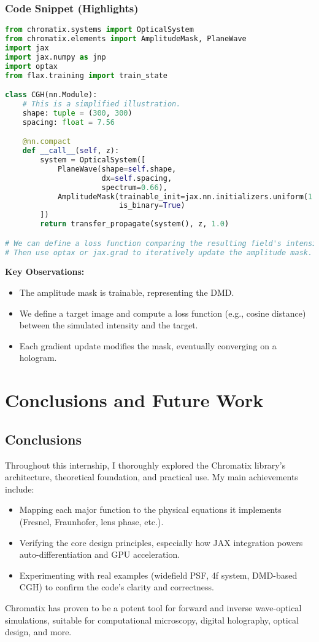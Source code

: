\documentclass[a4paper,12pt]{report}
\begin{document}
\subsection{Code Snippet (Highlights)}
\begin{lstlisting}[language=Python]
from chromatix.systems import OpticalSystem
from chromatix.elements import AmplitudeMask, PlaneWave
import jax
import jax.numpy as jnp
import optax
from flax.training import train_state

class CGH(nn.Module):
    # This is a simplified illustration.
    shape: tuple = (300, 300)
    spacing: float = 7.56

    @nn.compact
    def __call__(self, z):
        system = OpticalSystem([
            PlaneWave(shape=self.shape,
                      dx=self.spacing,
                      spectrum=0.66),
            AmplitudeMask(trainable_init=jax.nn.initializers.uniform(1.5),
                          is_binary=True)
        ])
        return transfer_propagate(system(), z, 1.0)

# We can define a loss function comparing the resulting field's intensity to a target image.
# Then use optax or jax.grad to iteratively update the amplitude mask.
\end{lstlisting}
\noindent \textbf{Key Observations:}
\begin{itemize}
    \item The amplitude mask is trainable, representing the DMD.
    \item We define a target image and compute a loss function (e.g., cosine distance) between the simulated intensity and the target.
    \item Each gradient update modifies the mask, eventually converging on a hologram.
\end{itemize}

\chapter{Conclusions and Future Work}


\section{Conclusions}
Throughout this internship, I thoroughly explored the Chromatix library’s architecture, theoretical foundation, and practical use. My main achievements include:
\begin{itemize}
    \item Mapping each major function to the physical equations it implements (Fresnel, Fraunhofer, lens phase, etc.).
    \item Verifying the core design principles, especially how JAX integration powers auto-differentiation and GPU acceleration.
    \item Experimenting with real examples (widefield PSF, 4f system, DMD-based CGH) to confirm the code's clarity and correctness.
\end{itemize}
Chromatix has proven to be a potent tool for forward and inverse wave-optical simulations, suitable for computational microscopy, digital holography, optical design, and more.
\end{document}
